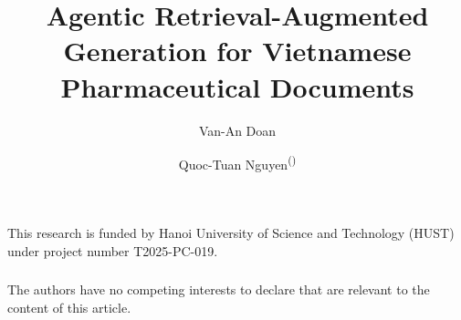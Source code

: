 \documentclass{llncs}
\begin{document}
\title{Agentic Retrieval-Augmented Generation for Vietnamese Pharmaceutical Documents}
\author{Van-An Doan \and Quoc-Tuan Nguyen\textsuperscript{(\Letter)}}
\maketitle








\begin{credits}
\subsubsection{\ackname} This research is funded by Hanoi University of Science and Technology (HUST) under project number T2025-PC-019.

\subsubsection{\discintname} The authors have no competing interests to declare that are relevant to the content of this article.
\end{credits}



\end{document}
